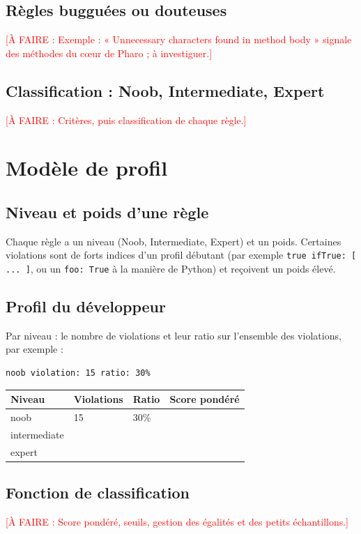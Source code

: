 \documentclass[11pt,a4paper]{report}
\newcommand{\todo}[1]{\textcolor{red}{[À FAIRE : #1]}}
\begin{document}
\section{Règles bugguées ou douteuses}
\todo{Exemple : « Unnecessary characters found in method body » signale des méthodes du cœur de Pharo ; à investiguer.}

\section{Classification : Noob, Intermediate, Expert}
\todo{Critères, puis classification de chaque règle.}

\chapter{Modèle de profil}
\section{Niveau et poids d’une règle}
Chaque règle a un niveau (Noob, Intermediate, Expert) et un poids. Certaines violations sont de forts indices d’un profil débutant (par exemple \lstinline|true ifTrue: [ ... ]|, ou un \lstinline|foo: True| à la manière de Python) et reçoivent un poids élevé.

\section{Profil du développeur}
Par niveau : le nombre de violations et leur ratio sur l’ensemble des violations, par exemple :

\begin{lstlisting}
noob violation: 15 ratio: 30%
\end{lstlisting}

\begin{table}[h]
\centering
\begin{tabular}{llll}
\toprule
Niveau & Violations & Ratio & Score pondéré \\
\midrule
noob & 15 & 30\% & \\
intermediate & & & \\
expert & & & \\
\bottomrule
\end{tabular}
\end{table}

\section{Fonction de classification}
\todo{Score pondéré, seuils, gestion des égalités et des petits échantillons.}
\end{document}
